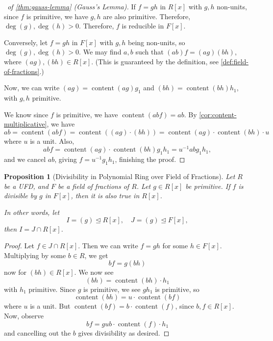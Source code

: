 \documentclass{article}
\newtheorem{proposition}[theorem]{Proposition}
\theoremstyle{definition}
\theoremstyle{remark}
\newcommand{\pqty}[1]{\left(#1\right)}
\newcommand{\bqty}[1]{\left[#1\right]}
\newcommand{\inverse}{^{-1}}
\newcommand{\idealsub}{\trianglelefteq}
\newcommand{\content}{\operatorname{content}}
\begin{document}
\begin{proof}[\proofname\ of \autoref{thm:gauss-lemma} (Gauss's Lemma)]
    If \(f = gh\) in \(R\bqty{x}\) with \(g, h\) non-units, since \(f\) is primitive, we have \(g, h\) are also primitive. Therefore, \(\deg \pqty{g}, \deg\pqty{h} > 0\). Therefore, \(f\) is reducible in \(F\bqty{x}\).

    Conversely, let \(f = gh\) in \(F\bqty{x}\) with \(g, h\) being non-units, so \(\deg\pqty{g}, \deg\pqty{h} > 0\). We may find \(a, b\) such that \(\pqty{ab}f = \pqty{ag} \pqty{bh}\), where \(\pqty{ag}, \pqty{bh} \in R\bqty{x}\). (This is guaranteed by the definition, see \autoref{def:field-of-fractions}.)

    Now, we can write \(\pqty{ag} = \content\pqty{ag} g_1\) and \(\pqty{bh} = \content\pqty{bh} h_1\), with \(g, h\) primitive.

    We know since \(f\) is primitive, we have \(\content\pqty{abf} = ab\). By \autoref{cor:content-multiplicative}, we have
    \[
        ab = \content\pqty{abf} = \content\pqty{\pqty{ag} \cdot \pqty{bh}} = \content\pqty{ag} \cdot \content\pqty{bh} \cdot u
    \]
    where \(u\) is a unit. Also,
    \[
        abf = \content\pqty{ag} \cdot \content\pqty{bh} g_1 h_1 = u\inverse ab g_1 h_1,
    \]
    and we cancel \(ab\), giving \(f = u\inverse g_1 h_1\), finishing the proof.
\end{proof}

\begin{proposition}[Divisibility in Polynomial Ring over Field of Fractions]
    \label{prop:divisibility-polynomial-ring-fof}%
    Let \(R\) be a UFD, and \(F\) be a field of fractions of \(R\). Let \(g \in R\bqty{x}\) be primitive. If \(f\) is divisible by \(g\) in \(F\bqty{x}\), then it is also true in \(R\bqty{x}\).

    In other words, let
    \[
        I = \pqty{g} \idealsub R\bqty{x}, \quad J = \pqty{g} \idealsub F\bqty{x},
    \]
    then \(I = J \cap R\bqty{x}\).
\end{proposition}

\begin{proof}
    Let \(f \in J \cap R\bqty{x}\). Then we can write \(f = gh\) for some \(h \in F\bqty{x}\). Multiplying by some \(b \in R\), we get
    \[
        bf = g \pqty{bh}
    \]
    now for \(\pqty{bh} \in R\bqty{x}\). We now see
    \[
        \pqty{bh} = \content\pqty{bh} \cdot h_1
    \]
    with \(h_1\) primitive. Since \(g\) is primitive, we see \(g h_1\) is primitive, so
    \[
        \content\pqty{bh} = u \cdot \content\pqty{bf}
    \] 
    where \(u\) is a unit. But \(\content\pqty{bf} = b \cdot \content\pqty{f}\), since \(b, f \in R\bqty{x}\). Now, observe
    \[
        bf = g u b \cdot \content\pqty{f} \cdot h_1
    \]
    and cancelling out the \(b\) gives divisibility as desired.
\end{proof}
\end{document}
